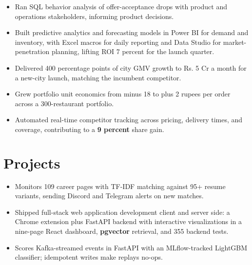 \documentclass[letterpaper,10pt]{article}
\begin{document}
\begin{itemize}
\item Ran SQL behavior analysis of offer-acceptance drops with product and operations stakeholders, informing product decisions.
\end{itemize}

\begin{itemize}
\item Built predictive analytics and forecasting models in Power BI for demand and inventory, with Excel macros for daily reporting and Data Studio for market-penetration planning, lifting ROI 7 percent for the launch quarter.
\item Delivered 400 percentage points of city GMV growth to Rs. 5 Cr a month for a new-city launch, matching the incumbent competitor.
\end{itemize}

\begin{itemize}
\item Grew portfolio unit economics from minus 18 to plus 2 rupees per order across a 300-restaurant portfolio.
\item Automated real-time competitor tracking across pricing, delivery times, and coverage, contributing to a \textbf{9 percent} share gain.
\end{itemize}

\section{Projects}
\begin{itemize}
\item Monitors 109 career pages with TF-IDF matching against 95+ resume variants, sending Discord and Telegram alerts on new matches.
\end{itemize}
\begin{itemize}
\item Shipped full-stack web application development client and server side: a Chrome extension plus FastAPI backend with interactive visualizations in a nine-page React dashboard, \textbf{pgvector} retrieval, and 355 backend tests.
\end{itemize}
\begin{itemize}
\item Scores Kafka-streamed events in FastAPI with an MLflow-tracked LightGBM classifier; idempotent writes make replays no-ops.
\end{itemize}
\end{document}
